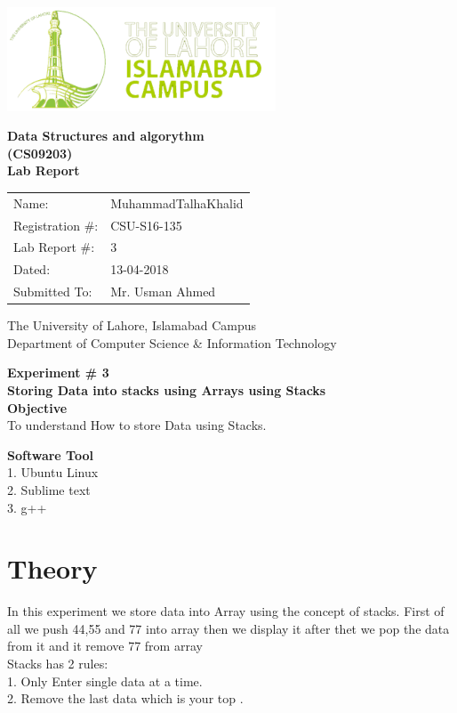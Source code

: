 \documentclass[11pt]{article}            %
\begin{document}
\begin{titlepage}
    \centering
  \vfill
    \includegraphics[width=8cm]{uni_logo.png} \\ 
	\vskip2cm
    {\bfseries\Large
	Data Structures and algorythm  \\ (CS09203)\\
	
	\vskip2cm
	Lab Report 
	 
	\vskip2cm
	}    

\begin{center}
\begin{tabular}{ l l  } 

Name: & MuhammadTalhaKhalid \\ 
Registration \#: &CSU-S16-135\\ 
Lab Report \#: & 3 \\ 
 Dated:& 13-04-2018\\ 
Submitted To:& Mr. Usman Ahmed\\ 

\end{tabular}
\end{center}
    \vfill
    The University of Lahore, Islamabad Campus\\
Department of Computer Science \& Information Technology
\end{titlepage}


    
    {\bfseries\Large
\centering
	Experiment \# 3 \\

Storing Data into stacks using Arrays using Stacks\\
	
	}    
 \vskip1cm
 \textbf {Objective}\\  To understand How to store Data using Stacks.
 
 \textbf {Software Tool} \\
1. Ubuntu Linux \\
2. Sublime text\\
3. g++\\

\section{Theory }              
In this experiment we store data into Array using the concept of stacks. First of all we push  44,55 and 77 into array then we display it after thet we pop the data from it and it remove 77 from array \\
Stacks has 2 rules:\\
1.	Only Enter single data at a time.\\
2.	Remove the last data which is your top .\\ \\
\end{document}
